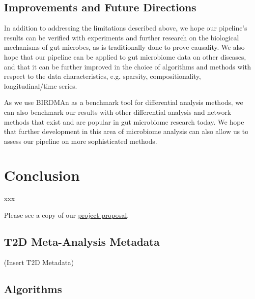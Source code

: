 \documentclass[12pt,letterpaper]{article}
\begin{document}
\subsection{Improvements and Future Directions}

In addition to addressing the limitations described above, we hope our pipeline’s results can be verified with experiments and further research on the biological mechanisms of gut microbes, as is traditionally done to prove causality. We also hope that our pipeline can be applied to gut microbiome data on other diseases, and that it can be further improved in the choice of algorithms and methods with respect to the data characteristics, e.g. sparsity, compositionality, longitudinal/time series. 

As we use BIRDMAn as a benchmark tool for differential analysis methods, we can also benchmark our results with other differential analysis and network methods that exist and are popular in gut microbiome research today. We hope that further development in this area of microbiome analysis can also allow us to assess our pipeline on more sophisticated methods. 

\section{Conclusion}

xxx


\clearpage
\makereference





\clearpage
\makeappendix

Please see a copy of our \href{https://drive.google.com/file/d/1fEGpmoSULPbpG6bcopPBKdlyF6gG_Gv_/view?usp=sharing}{project proposal}. 

\subsection{T2D Meta-Analysis Metadata}

(Insert T2D Metadata)

\subsection{Algorithms}
\end{document}
